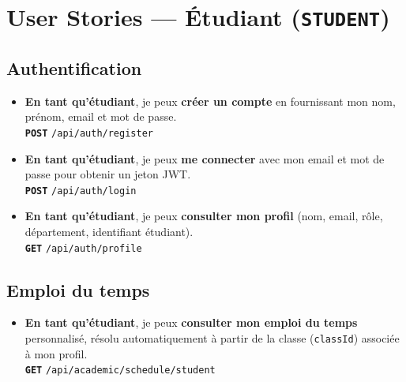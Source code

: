 \documentclass[12pt,a4paper]{article}
\newcommand{\route}[1]{\texorpdfstring{\texttt{\small\color{routeGray}#1}}{#1}}
\newcommand{\httpmethod}[1]{%
  \ifstrequal{#1}{GET}{\colorbox{blue!15}{\texttt{\bfseries\color{blue!70!black}GET}}}{}%
  \ifstrequal{#1}{POST}{\colorbox{green!18}{\texttt{\bfseries\color{green!60!black}POST}}}{}%
  \ifstrequal{#1}{PUT}{\colorbox{orange!18}{\texttt{\bfseries\color{orange!70!black}PUT}}}{}%
  \ifstrequal{#1}{DELETE}{\colorbox{red!15}{\texttt{\bfseries\color{red!70!black}DELETE}}}{}%
}
\newcommand{\usmark}{\color{accentGold}$\blacktriangleright$\;}
\begin{document}
\newpage

\section{User Stories — Étudiant (\texttt{STUDENT})}

\begin{studentbox}

\subsection*{Authentification}

\begin{itemize}[leftmargin=1.2cm, labelsep=0.4cm]
  \item[\usmark] \textbf{En tant qu'étudiant}, je peux \textbf{créer un compte} en fournissant mon nom, prénom, email et mot de passe.\\
    \httpmethod{POST} \route{/api/auth/register}

  \item[\usmark] \textbf{En tant qu'étudiant}, je peux \textbf{me connecter} avec mon email et mot de passe pour obtenir un jeton JWT.\\
    \httpmethod{POST} \route{/api/auth/login}

  \item[\usmark] \textbf{En tant qu'étudiant}, je peux \textbf{consulter mon profil} (nom, email, rôle, département, identifiant étudiant).\\
    \httpmethod{GET} \route{/api/auth/profile}
\end{itemize}

\subsection*{Emploi du temps}

\begin{itemize}[leftmargin=1.2cm, labelsep=0.4cm]
  \item[\usmark] \textbf{En tant qu'étudiant}, je peux \textbf{consulter mon emploi du temps} personnalisé, résolu automatiquement à partir de la classe (\texttt{classId}) associée à mon profil.\\
    \httpmethod{GET} \route{/api/academic/schedule/student}
\end{itemize}


\end{studentbox}
\end{document}
